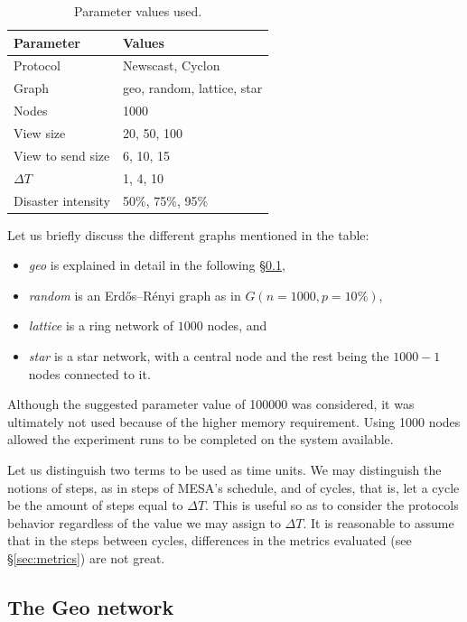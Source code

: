 \documentclass[a4paper]{ifacconf}
\newcommand{\DT}{\ensuremath{{\Delta}T}}
\begin{document}
\begin{table}
    \centering\begin{tabular}{ll}
        Parameter & Values\\
        \hline
        Protocol & Newscast, Cyclon \\
        Graph & geo, random, lattice, star \\
        Nodes & \num{1000} \\
        View size & 20, 50, 100 \\
        View to send size & 6, 10, 15 \\
        \DT & 1, 4, 10 \\
        Disaster intensity & 50\%, 75\%, 95\% \\
    \end{tabular}
    \caption{Parameter values used.}
    \label{tab:parameters}
\end{table}

Let us briefly discuss the different graphs mentioned in the table:

\begin{itemize}
    \item \emph{geo} is explained in detail in the following \S\ref{sec:geo},
    \item \emph{random} is an Erdős–Rényi graph as in $G(n = 1000, p = 10\%)$,
    \item \emph{lattice} is a ring network of $1000$ nodes, and
    \item \emph{star} is a star network, with a central node and the rest being the $1000 - 1$ nodes connected to it.
\end{itemize}

Although the suggested parameter value of \num{100000} was considered, it was ultimately not used because of the higher memory requirement.
Using 1000 nodes allowed the experiment runs to be completed on the system available.

Let us distinguish two terms to be used as time units. 
We may distinguish the notions of steps, as in steps of MESA's schedule, and of cycles, that is, let a cycle be the amount of steps equal to \DT.
This is useful so as to consider the protocols behavior regardless of the value we may assign to \DT.
It is reasonable to assume that in the steps between cycles, differences in the metrics evaluated (see \S\ref{sec:metrics}) are not great.

\subsection{The Geo network}\label{sec:geo}
\end{document}
